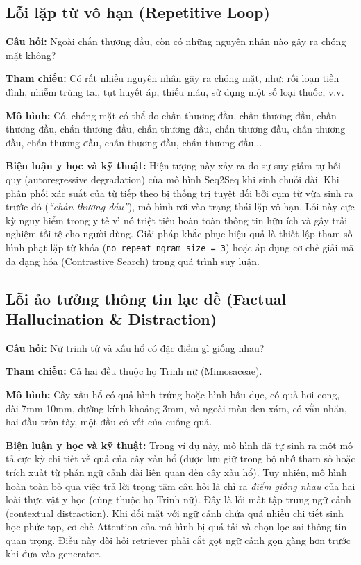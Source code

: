 \subsection{Lỗi lặp từ vô hạn (Repetitive Loop)}
\begin{tcolorbox}[colback=codebg, colframe=myblue, title={Ví dụ thực tế về lỗi lặp từ vô hạn do suy giảm tự hồi quy}]
\small\raggedright
\textbf{Câu hỏi:} Ngoài chấn thương đầu, còn có những nguyên nhân nào gây ra chóng mặt không?\par
\textbf{Tham chiếu:} Có rất nhiều nguyên nhân gây ra chóng mặt, như: rối loạn tiền đình, nhiễm trùng tai, tụt huyết áp, thiếu máu, sử dụng một số loại thuốc, v.v.\par
\textbf{Mô hình:} Có, chóng mặt có thể do chấn thương đầu, chấn thương đầu, chấn thương đầu, chấn thương đầu, chấn thương đầu, chấn thương đầu, chấn thương đầu, chấn thương đầu, chấn thương đầu, chấn thương đầu...
\end{tcolorbox}
\textbf{Biện luận y học và kỹ thuật:} Hiện tượng này xảy ra do sự suy giảm tự hồi quy (autoregressive degradation) của mô hình Seq2Seq khi sinh chuỗi dài. Khi phân phối xác suất của từ tiếp theo bị thống trị tuyệt đối bởi cụm từ vừa sinh ra trước đó (\textit{``chấn thương đầu''}), mô hình rơi vào trạng thái lặp vô hạn. Lỗi này cực kỳ nguy hiểm trong y tế vì nó triệt tiêu hoàn toàn thông tin hữu ích và gây trải nghiệm tồi tệ cho người dùng. Giải pháp khắc phục hiệu quả là thiết lập tham số hình phạt lặp từ khóa (\texttt{no\_repeat\_ngram\_size = 3}) hoặc áp dụng cơ chế giải mã đa dạng hóa (Contrastive Search) trong quá trình suy luận.

\subsection{Lỗi ảo tưởng thông tin lạc đề (Factual Hallucination \& Distraction)}
\begin{tcolorbox}[colback=codebg, colframe=myblue, title={Ví dụ thực tế về lỗi sinh thông tin ảo tưởng lạc đề}]
\small\raggedright
\textbf{Câu hỏi:} Nữ trinh tử và xấu hổ có đặc điểm gì giống nhau?\par
\textbf{Tham chiếu:} Cả hai đều thuộc họ Trinh nữ (Mimosaceae).\par
\textbf{Mô hình:} Cây xấu hổ có quả hình trứng hoặc hình bầu dục, có quả hơi cong, dài 7mm 10mm, đường kính khoảng 3mm, vỏ ngoài màu đen xám, có vằn nhăn, hai đầu tròn tày, một đầu có vết của cuống quả.
\end{tcolorbox}
\textbf{Biện luận y học và kỹ thuật:} Trong ví dụ này, mô hình đã tự sinh ra một mô tả cực kỳ chi tiết về quả của cây xấu hổ (được lưu giữ trong bộ nhớ tham số hoặc trích xuất từ phần ngữ cảnh dài liên quan đến cây xấu hổ). Tuy nhiên, mô hình hoàn toàn bỏ qua việc trả lời trọng tâm câu hỏi là chỉ ra \textit{điểm giống nhau} của hai loài thực vật y học (cùng thuộc họ Trinh nữ). Đây là lỗi mất tập trung ngữ cảnh (contextual distraction). Khi đối mặt với ngữ cảnh chứa quá nhiều chi tiết sinh học phức tạp, cơ chế Attention của mô hình bị quá tải và chọn lọc sai thông tin quan trọng. Điều này đòi hỏi retriever phải cắt gọt ngữ cảnh gọn gàng hơn trước khi đưa vào generator.

